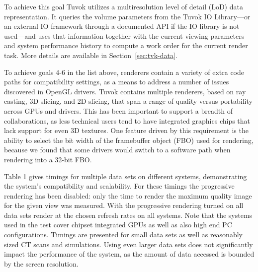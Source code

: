 To achieve this goal Tuvok utilizes a multiresolution level of detail
(LoD) data representation. It queries the volume parameters from the
Tuvok IO Library---or an external IO framework through a documented
API if the IO library is not used---and uses that information together
with the current viewing parameters and system performance history to
compute a work order for the current render task. More
details are available in Section~\ref{sec:tvk-data}.

To achieve goals 4-6 in the list above, renderers contain a variety of
extra code paths for compatibility settings, as a means to address a
number of issues discovered in OpenGL drivers. Tuvok contains multiple
renderers, based on ray casting, 3D slicing, and 2D slicing, that
span a range of quality versus portability across GPUs and drivers.
This has been important to support a breadth of collaborations, as
less technical users tend to have integrated graphics chips that lack
support for even 3D textures. One feature driven by this requirement
is the ability to select the bit width of the framebuffer object (FBO)
used for rendering, because we found that some drivers would switch to
a software path when rendering into a 32-bit FBO.

Table 1 gives timings for multiple data sets on different
systems, demonstrating the system's compatibility and scalability.
For these timings the progressive rendering has been
disabled: only the time to render the maximum quality
image for the given view was measured. With the progressive
rendering turned on all data sets render at the chosen refresh
rates on all systems. Note that the systems used in the test
cover chipset integrated GPUs as well as also high end PC
configurations. Timings are presented for small data sets as
well as reasonably sized CT scans and simulations. Using
even larger data sets does not significantly impact the
performance of the system, as the amount of data accessed is
bounded by the screen resolution.

